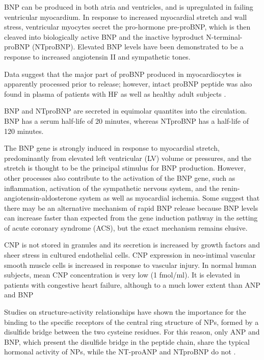 \documentclass[14pt,a4paper,onecolumn]{extarticle}
\begin{document}

BNP can be produced in both atria and ventricles, and is upregulated in failing ventricular myocardium. In response to increased myocardial stretch and wall stress, ventricular myocytes secret the pro-hormone pre-proBNP, which is then cleaved into biologically active BNP and the inactive byproduct N-terminal-proBNP (NTproBNP). Elevated BNP levels have been demonstrated to be a response to increased angiotensin II and sympathetic tones. \citep{Iwanaga2006} %

Data suggest that the major part of proBNP produced in myocardiocytes is apparently processed prior to release; however, intact proBNP peptide was also found in plasma of patients with HF as well as healthy adult subjects \citep{14}. %

BNP and NTproBNP are secreted in equimolar quantites into the circulation.  BNP has a serum half-life of 20 minutes, whereas NTproBNP has a half-life of 120 minutes. \citep{DanielsandMaisel2007} %

The BNP gene is strongly induced in response to myocardial stretch, predominantly from elevated left ventricular (LV) volume or pressures, and the stretch is thought to be the principal stimulus for BNP production. However, other processes also contribute to the activation of the BNP gene, such as inflammation, activation of the sympathetic nervous system, and the renin-angiotensin-aldosterone system as well as myocardial ischemia. Some suggest that there may be an alternative mechanism of rapid BNP release because BNP levels can increase faster than expected from the gene induction pathway in the setting of acute coronary syndrome (ACS), but the exact mechanism remains elusive. \citep{Gaggin2014} %

CNP is not stored in granules and its secretion is increased by growth factors and sheer stress in cultured endothelial cells. CNP expression in neo-intimal vascular smooth muscle cells is increased in response to vascular injury. In normal human subjects, mean CNP concentration is very low (1 fmol/ml). It is elevated in patients with congestive heart failure, although to a much lower extent than ANP and BNP \citep{Charles2006}%

Studies on structure-activity relationships have shown the importance for the binding to the specific receptors of the central ring structure of NPs, formed by a disulfide bridge between the two cysteine  residues. For this reason, only ANP and BNP, which present the disulfide bridge in the peptide chain, share the typical hormonal activity of NPs, while the NT-proANP and NTproBNP do not \citep{bib35} \citep{bib36} \citep{bib37}.
\end{document}
